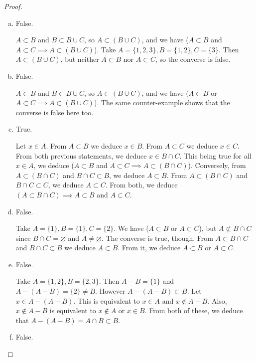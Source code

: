 \documentclass[11pt,a4paper,twoside]{article}
\theoremstyle{definition}
\begin{document}
\begin{proof}\hfill
\begin{enumerate}[(a)]

\item False.

  $A \subset B$ and $B \subset B \cup C$, so $A \subset (B \cup C)$, and we have ($A \subset B$ and $A \subset C \implies A \subset (B \cup C)$).
  Take $A = \{ 1, 2, 3 \}, B = \{ 1, 2 \}, C = \{ 3 \}$. Then $A \subset (B \cup C)$, but neither $A \subset B$ nor $A \subset C$, so the converse is false.

\item False.

  $A \subset B$ and $B \subset B \cup C$, so $A \subset (B \cup C)$, and we have ($A \subset B$ or $A \subset C \implies A \subset (B \cup C)$).
  The same counter-example shows that the converse is false here too.

\item True.

  Let $x \in A$. From $A \subset B$ we deduce $x \in B$. From $A \subset C$ we deduce $x \in C$. From both previous statements, we deduce $x \in B \cap C$.
  This being true for all $x \in A$, we deduce ($A \subset B$ and $A \subset C \implies A \subset (B \cap C)$).
  Conversely, from $A \subset (B \cap C)$ and $B \cap C \subset B$, we deduce $A \subset B$.
  From $A \subset (B \cap C)$ and $B \cap C \subset C$, we deduce $A \subset C$.
  From both, we deduce $(A \subset B \cap C) \implies A \subset B$ and $A \subset C$.

\item False.

  Take $A = \{ 1 \}, B = \{ 1 \}, C = \{ 2 \}$. We have ($A \subset B$ or $A \subset C$), but $A \not\subset B \cap C$ since $B \cap C = \varnothing$ and $A \not= \varnothing$.
  The converse is true, though. From $A \subset B \cap C$ and $B \cap C \subset B$ we deduce $A \subset B$. From it, we deduce $A \subset B$ or $A \subset C$.

\item False.

  Take $A = \{ 1, 2 \}, B = \{ 2, 3 \}$. Then $A - B = \{ 1 \}$ and $A - (A - B) = \{ 2 \} \not= B$.
  However $A - (A - B) \subset B$. Let $x \in A - (A - B)$. This is equivalent to $x \in A$ and $x \notin A - B$.
  Also, $x \notin A - B$ is equivalent to $x \notin A$ or $x \in B$.
  From both of these, we deduce that $A - (A - B) = A \cap B \subset B$.

\item False.


\end{enumerate}
\end{proof}
\end{document}
